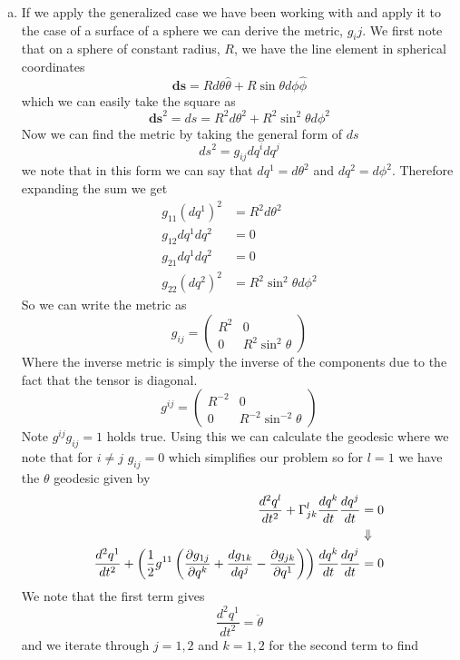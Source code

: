 \documentclass[11pt]{article}
\numberwithin{equation}{section}
\begin{document}
\begin{enumerate}[(a)]
\item If we apply the generalized case we have been working with and apply it to the case of
a surface of a sphere we can derive the metric, $g_ij$. We first note that on a sphere of 
constant radius, $R$, we have the line element in spherical coordinates
$$\mathbf{ds} = Rd\theta\hat{\theta} + R\sin\theta{d\phi}\hat{\phi}$$ 
which we can easily take the square as
$$\mathbf{ds}^2 = ds = R^2d\theta^2 + R^2\sin^2\theta{d\phi}^2$$
Now we can find the metric by taking the general form of $ds$ 
$$ds^2 = g_{ij}dq^idq^j$$
we note that in this form we can say that $dq^1 = d\theta^2$ and $dq^2 = d\phi^2$. Therefore
expanding the sum we get
\begin{align*}
g_{11}(dq^1)^2 &= R^2d\theta^2\\
g_{12}dq^1dq^2 &= 0\\
g_{21}dq^1dq^2 &= 0\\
g_{22}(dq^2)^2 &= R^2\sin^2\theta d\phi^2
\end{align*}
So we can write the metric as
$$g_{ij} = \left(\begin{array}{cc}
                R^2               &0\\
                0                 &R^2\sin^2\theta
            \end{array}\right)$$
Where the inverse metric is simply the inverse of the components due to the fact that the 
tensor is diagonal.
$$g^{ij} = \left(\begin{array}{cc}
                R^{-2}               &0\\
                0                 &R^{-2}\sin^{-2}\theta
            \end{array}\right)$$
Note $g^{ij}g_{ij}=1$ holds true. Using this we can calculate the geodesic where we note that
for $i\ne{j}$ $g_{ij}=0$ which simplifies our problem so for $l=1$ we have the $\theta$ 
geodesic given by
\begin{align*}
\frac{d^2q^l}{dt^2} + \Gamma^{l}_{jk}\frac{dq^{k}}{dt}\frac{dq^j}{dt} &= 0\\
&\Downarrow\\
\frac{d^2q^1}{dt^2} + \left(\frac{1}{2}g^{11}\left(\frac{\partial g_{1j}}{\partial q^k} + \frac{dg_{1k}}{dq^{j}} - \frac{\partial{g_{jk}}}{\partial{q^1}}\right)\right)\frac{dq^{k}}{dt}\frac{dq^j}{dt} &= 0
\end{align*}
We note that the first term gives
$$\frac{d^2q^1}{dt^2} = \ddot{\theta}$$
and we iterate through $j=1,2$ and $k=1,2$ for the second term to find
\begin{align*}

\end{align*}
\end{enumerate}
\end{document}
